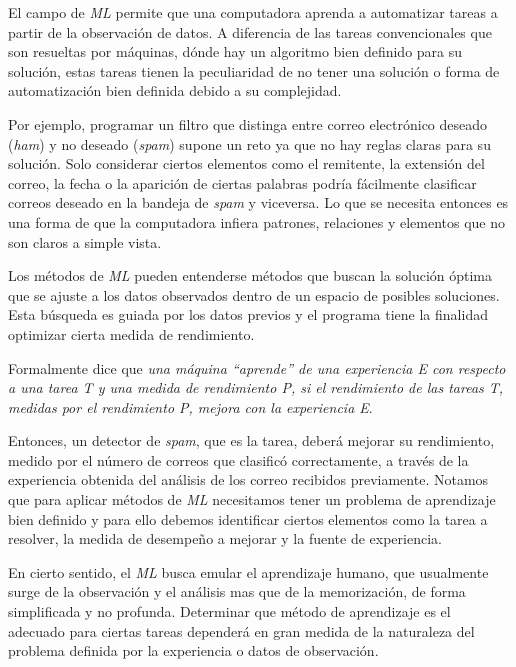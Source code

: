 \documentclass[letterpaper,12pt,oneside]{book}
\theoremstyle{definition}
\begin{document}
El campo de \textit{ML} permite que una computadora aprenda a automatizar tareas a partir de la observación de datos. A diferencia de las tareas convencionales que son resueltas por máquinas, dónde hay un algoritmo bien definido para su solución, estas tareas tienen la peculiaridad de no tener una solución o forma de automatización bien definida debido a su complejidad.

Por ejemplo, programar un filtro que distinga entre correo electrónico deseado (\textit{ham}) y no deseado (\textit{spam}) supone un reto ya que no hay reglas claras para su solución. Solo considerar ciertos elementos como el remitente, la extensión del correo, la fecha o la aparición de ciertas palabras podría fácilmente clasificar correos deseado en la bandeja de \textit{spam} y viceversa. Lo que se necesita entonces es una forma de que la computadora infiera patrones, relaciones y elementos que no son claros a simple vista.

Los métodos de \textit{ML} pueden entenderse métodos que buscan la solución óptima que se ajuste a los datos observados dentro de un espacio de posibles soluciones. Esta búsqueda es guiada por los datos previos y el programa tiene la finalidad optimizar cierta medida de rendimiento.

Formalmente \citet{mitchell1997machine} dice que \textit{una máquina ``aprende'' de una experiencia E con respecto a una tarea T y una medida de rendimiento P, si el rendimiento de las tareas T, medidas por el rendimiento P, mejora con la experiencia E}. 

Entonces, un detector de \textit{spam}, que es la tarea, deberá mejorar su rendimiento, medido por el número de correos que clasificó correctamente, a través de la experiencia obtenida del análisis de los correo recibidos previamente. Notamos que para aplicar métodos de \textit{ML} necesitamos tener un problema de aprendizaje bien definido y para ello debemos identificar ciertos elementos como la tarea a resolver, la medida de desempeño a mejorar y la fuente de experiencia.

En cierto sentido, el \textit{ML} busca emular el aprendizaje humano, que usualmente surge de la observación y el análisis mas que de la memorización, de forma simplificada y no profunda. Determinar que método de aprendizaje es el adecuado para ciertas tareas dependerá en gran medida de la naturaleza del problema definida por la experiencia o datos de observación.
\end{document}
